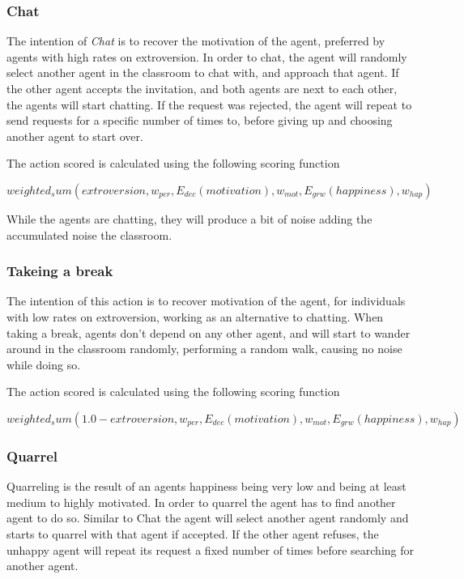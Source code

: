 \subsubsection{Chat}
The intention of \textit{Chat} is to recover the motivation of the agent, preferred
by agents with high rates on extroversion. In order to chat, the agent will
randomly select another agent in the classroom to chat with, and approach that agent.
If the other agent accepts the invitation, and both agents are next to each other,
the agents will start chatting. If the request was rejected, the agent will repeat
to send requests for a specific number of times to, before giving up and choosing
another agent to start over.

The action scored is calculated using the following scoring function

\begin{equation}
    weighted_sum(extroversion, w_{per}, E_{dec}(motivation), w_{mot}, E_{grw}(happiness), w_{hap})
\end{equation}

While the agents are chatting, they will produce a bit of noise adding the
accumulated noise the classroom.

\subsubsection{Takeing a break}
The intention of this action is to recover motivation of the agent, for individuals
with low rates on extroversion, working as an alternative to chatting.
When taking a break, agents don't depend on any other agent, and will start to
wander around in the classroom randomly, performing a random walk, causing no noise
while doing so.

The action scored is calculated using the following scoring function

\begin{equation}
    weighted_sum(1.0 - extroversion, w_{per}, E_{dec}(motivation), w_{mot}, E_{grw}(happiness), w_{hap})
\end{equation}

\subsubsection{Quarrel}
Quarreling is the result of an agents happiness being very low and being at least
medium to highly motivated. In order to quarrel the agent has to find another agent
to do so. Similar to Chat the agent will select another agent randomly and starts
to quarrel with that agent if accepted. If the other agent refuses, the unhappy
agent will repeat its request a fixed number of times before searching for another agent.


